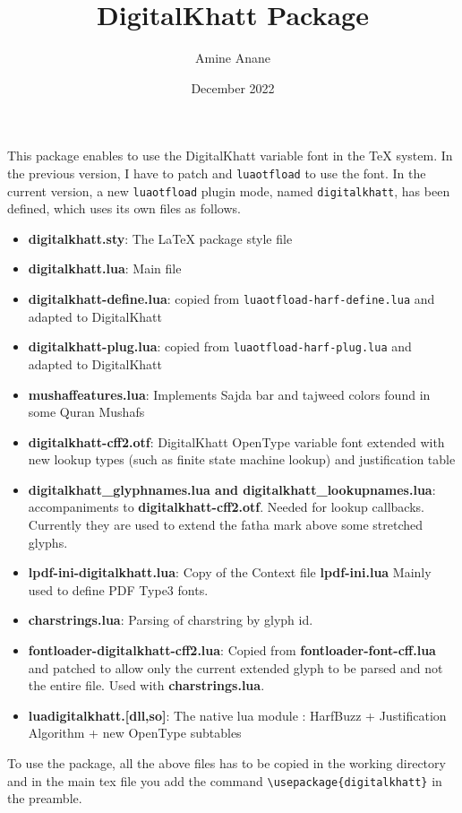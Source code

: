 \documentclass{article}
\title{DigitalKhatt \LuaLaTeX{} Package}
\date{December 2022}
\author{Amine Anane}
\newcommand{\DigitalKhatt}{DigitalKhatt}
\newcommand{\LuaOTFLoad}{\mbox{\texttt{luaotfload}}}
\begin{document}
\maketitle
This \LuaLaTeX{} package enables to use the \DigitalKhatt{} variable font in the \TeX{} system. In the previous version, I have to patch \LuaTeX{} and \LuaOTFLoad{} to use the font.
In the current version, a new \LuaOTFLoad{} plugin mode, named \mbox{\texttt{digitalkhatt}}, has been defined, which uses its own files as follows.
\begin{itemize}
  \item {\bf digitalkhatt.sty}: The \LaTeX{} package style file
  \item {\bf digitalkhatt.lua}: Main file
  \item {\bf digitalkhatt-define.lua}: copied from \mbox{\texttt{luaotfload-harf-define.lua}} and adapted to \DigitalKhatt{}
  \item {\bf digitalkhatt-plug.lua}: copied from \mbox{\texttt{luaotfload-harf-plug.lua}} and adapted to \DigitalKhatt{}
  \item {\bf mushaffeatures.lua}: Implements Sajda bar  and tajweed colors found in some Quran Mushafs
  \item {\bf digitalkhatt-cff2.otf}: DigitalKhatt OpenType variable font extended with new lookup types (such as finite state machine lookup) and justification table
  \item {\bf digitalkhatt\_glyphnames.lua and digitalkhatt\_lookupnames.lua}: accompaniments to {\bf digitalkhatt-cff2.otf}. Needed for lookup callbacks.
    Currently they are used to extend the fatha mark above some stretched glyphs.
  \item {\bf lpdf-ini-digitalkhatt.lua}: Copy of the Context file {\bf lpdf-ini.lua} Mainly  used to define PDF Type3 fonts.
  \item {\bf charstrings.lua}: Parsing of charstring by glyph id.
  \item {\bf fontloader-digitalkhatt-cff2.lua}: Copied from {\bf fontloader-font-cff.lua} and patched to allow only the current extended glyph to be parsed and not the entire file. Used with {\bf charstrings.lua}.
  \item {\bf luadigitalkhatt.[dll,so]}: The native lua module : HarfBuzz + Justification Algorithm + new OpenType subtables 
\end{itemize}
To use the package, all the above files has to be copied in the working directory and in the main tex file you add the command \verb!\usepackage{digitalkhatt}! in the preamble.
\end{document}
